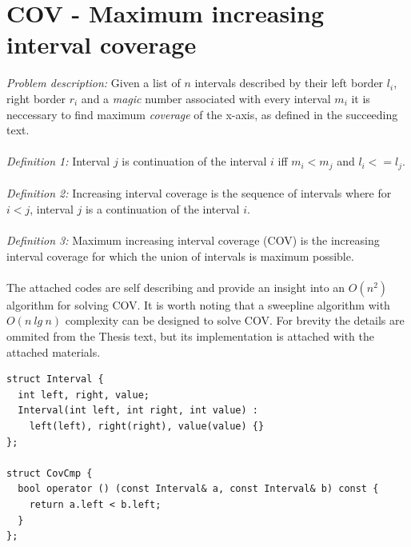 \documentclass[times, utf8, diplomski]{fer}
\begin{document}
\pagebreak

\section{COV - Maximum increasing interval coverage}

\emph{Problem description: } Given a list of $n$ intervals described by their left border $l_i$, right border $r_i$ and a \emph{magic} number associated with every interval $m_i$ it is neccessary to find maximum \emph{coverage} of the x-axis, as defined in the succeeding text.\\
\\
\emph{Definition 1: } Interval $j$ is continuation of the interval $i$ iff $m_i<m_j$ and $l_i <= l_j$.\\
\\
\emph{Definition 2: } Increasing interval coverage is the sequence of intervals where for $i<j$, interval $j$ is a continuation of the interval $i$.\\
\\
\emph{Definition 3: } Maximum increasing interval coverage (COV) is the increasing interval coverage for which the union of intervals is maximum possible.\\
\\
The attached codes are self describing and provide an insight into an $O(n^2)$ algorithm for solving COV. It is worth noting that a sweepline algorithm with $O(n\ lg\ n)$ complexity can be designed to solve COV. For brevity the details are ommited from the Thesis text, but its implementation is attached with the attached materials.\\

\begin{algorithm}[H]
\begin{lstlisting}
struct Interval {
  int left, right, value;
  Interval(int left, int right, int value) :
    left(left), right(right), value(value) {}
};

struct CovCmp {
  bool operator () (const Interval& a, const Interval& b) const {
    return a.left < b.left;
  }
};
\end{lstlisting}
\end{algorithm}
\end{document}
